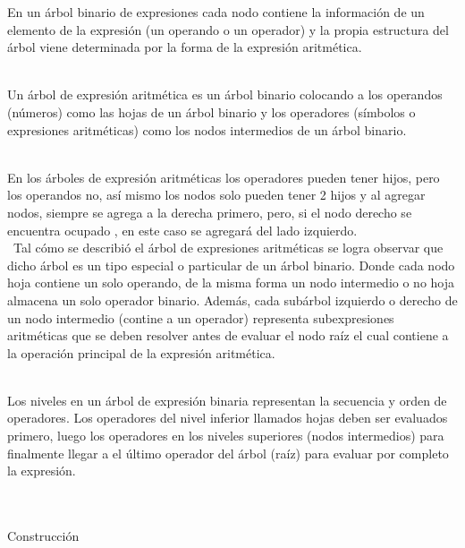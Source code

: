 \documentclass{report}
\begin{document}
En un árbol binario de expresiones cada nodo contiene la información de un elemento de la expresión (un operando o un operador) y la propia estructura del árbol viene determinada por la forma de la expresión aritmética.\\\

Un árbol de expresión aritmética es un árbol binario colocando a los operandos (números) como las hojas de un árbol binario y los operadores (símbolos o expresiones aritméticas) como los nodos intermedios de un árbol binario.\\\

En los árboles de expresión aritméticas los operadores pueden tener hijos, pero los operandos no, así mismo los nodos solo pueden tener 2 hijos y al agregar nodos, siempre se agrega a la derecha primero, pero, si el nodo derecho se encuentra ocupado , en este caso se agregará del lado izquierdo.\\\
Tal cómo se describió el árbol de expresiones aritméticas se logra observar que dicho árbol es un tipo especial o particular de un árbol binario. Donde cada nodo hoja contiene un solo operando, de la misma forma un nodo intermedio o no hoja almacena un solo operador binario. Además, cada subárbol izquierdo o derecho de un nodo intermedio (contine a un operador) representa subexpresiones aritméticas que se deben resolver antes de evaluar el nodo raíz el cual contiene a la operación principal de la expresión aritmética.\\\

 Los niveles en un árbol de expresión binaria representan la secuencia y orden de operadores. Los operadores del nivel inferior llamados hojas deben ser evaluados primero, luego los operadores en los niveles superiores (nodos intermedios)  para finalmente llegar a el último operador  del árbol (raíz) para evaluar por completo la expresión.\\\
 \\\
 
Construcción\\\
\end{document}

